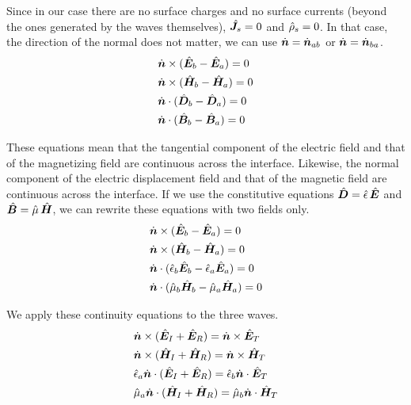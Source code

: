 Since in our case there are no surface charges and no surface currents (beyond the ones generated by the waves themselves), $\hat{\bm{J}}_s=0$ and $\hat{\rho}_s=0$.
In that case, the direction of the normal does not matter, we can use $\dot{\bm{n}}=\dot{\bm{n}}_{ab}$ or $\dot{\bm{n}}=\dot{\bm{n}}_{ba}$.
\begin{align}
    &\dot{\bm{n}} \times (\hat{\bm{E}}_b - \hat{\bm{E}}_a) = 0 \\
    &\dot{\bm{n}} \times (\hat{\bm{H}}_b - \hat{\bm{H}}_a) = 0 \\
    &\dot{\bm{n}} \cdot  (\hat{\bm{D}}_b - \hat{\bm{D}}_a) = 0 \\
    &\dot{\bm{n}} \cdot  (\hat{\bm{B}}_b - \hat{\bm{B}}_a) = 0
\end{align}

These equations mean that the tangential component of the electric field and that of the magnetizing field are continuous across the interface.
Likewise, the normal component of the electric displacement field and that of the magnetic field are continuous across the interface.
If we use the constitutive equations $\hat{\bm{D}}=\hat{\epsilon} \, \hat{\bm{E}}$ and $\hat{\bm{B}}=\hat{\mu} \, \hat{\bm{H}}$, we can rewrite these equations with two fields only.
\begin{align}
    &\dot{\bm{n}} \times (\hat{\bm{E}}_b - \hat{\bm{E}}_a) = 0 \\
    &\dot{\bm{n}} \times (\hat{\bm{H}}_b - \hat{\bm{H}}_a) = 0 \\
    &\dot{\bm{n}} \cdot  (\hat{\epsilon}_b \hat{\bm{E}}_b - \hat{\epsilon}_a \hat{\bm{E}}_a) = 0 \\
    &\dot{\bm{n}} \cdot  (\hat{\mu}_b      \hat{\bm{H}}_b - \hat{\mu}_a      \hat{\bm{H}}_a) = 0
\end{align}

We apply these continuity equations to the three waves.
\begin{align}
    &\dot{\bm{n}} \times (\hat{\bm{E}}_I + \hat{\bm{E}}_R) = \dot{\bm{n}} \times \hat{\bm{E}}_T \\
    &\dot{\bm{n}} \times (\hat{\bm{H}}_I + \hat{\bm{H}}_R) = \dot{\bm{n}} \times \hat{\bm{H}}_T \\
    &\hat{\epsilon}_a \dot{\bm{n}} \cdot (\hat{\bm{E}}_I + \hat{\bm{E}}_R) =
     \hat{\epsilon}_b \dot{\bm{n}} \cdot \hat{\bm{E}}_T \\
    &\hat{\mu}_a \dot{\bm{n}} \cdot (\hat{\bm{H}}_I + \hat{\bm{H}}_R) =
     \hat{\mu}_b \dot{\bm{n}} \cdot \hat{\bm{H}}_T
\end{align}



